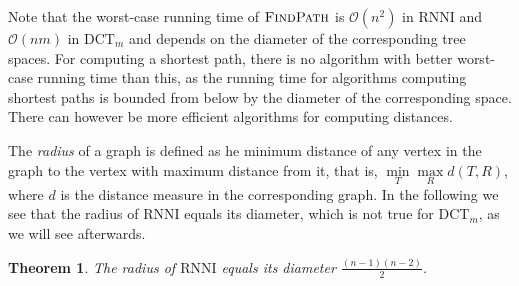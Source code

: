 \documentclass[11pt]{amsart}
\newtheorem{theorem}{Theorem}
\newcommand{\rnni}{\mathrm{RNNI}}
\newcommand{\findpath}{\textsc{FindPath}}
\newcommand{\dtt}{\mathrm{DCT}}
\renewcommand{\O}{\mathcal O}
\newcommand{\summary}[1]{} %
\begin{document}
Note that the worst-case running time of $\findpath$ is $\O(n^2)$ in $\rnni$ and $\O(nm)$ in $\dtt_m$ and depends on the diameter of the corresponding tree spaces.
For computing a shortest path, there is no algorithm with better worst-case running time than this, as the running time for algorithms computing shortest paths is bounded from below by the diameter of the corresponding space.
There can however be more efficient algorithms for computing distances.
\vspace{12pt}

\summary{Radius of $\rnni$ is equal to its diameter.}
The \emph{radius} of a graph is defined as he minimum distance of any vertex in the graph to the vertex with maximum distance from it, that is, $\min\limits_{T}\max\limits_{R} d(T,R)$, where $d$ is the distance measure in the corresponding graph.
In the following we see that the radius of $\rnni$ equals its diameter, which is not true for $\dtt_m$, as we will see afterwards.

\begin{theorem}
	The radius of $\rnni$ equals its diameter $\frac{(n-1)(n-2)}{2}$.
	\label{thm:radius_rnni}
\end{theorem}
\end{document}
